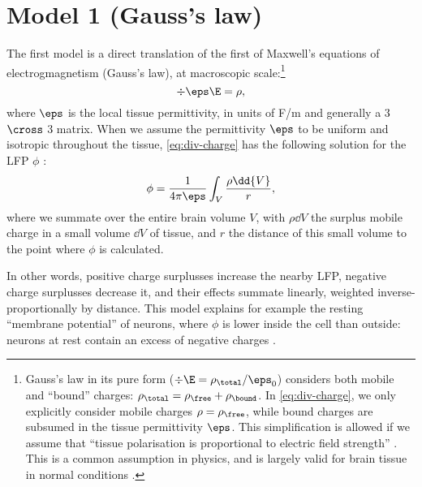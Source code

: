 \section{Model 1 (Gauss's law)}

The first model is a direct translation of the first of Maxwell's equations of electrogmagnetism (Gauss's law), at macroscopic scale:\footnote{Gauss's law in its pure form ($\div{\E} = \rho_\total / \eps_0$) considers both mobile and ``bound'' charges: $\rho_\total = \rho_\free + \rho_\bound$. In \cref{eq:div-charge}, we only explicitly consider mobile charges $\rho = \rho_\free$, while bound charges are subsumed in the tissue permittivity $\eps$. This simplification is allowed if we assume that ``tissue polarisation is proportional to electric field strength'' \cite{Feynman2013}. This is a common assumption in physics, and is largely valid for brain tissue in normal conditions \cite{Nunez2006}.}
%
\begin{equation}
\label{eq:div-charge}
\div{\eps \E} = \rho,
\end{equation}
%
where $\eps$ is the local tissue permittivity, in units of F/m and generally a 3 $\cross$ 3 matrix. When we assume the permittivity $\eps$ to be uniform and isotropic throughout the tissue\footnotemark{}, \cref{eq:div-charge} has the following solution for the LFP $\phi$ \cite{Feynman2013}:
%
\begin{equation}
\label{eq:phi-charge}
\phi = \frac{1}{4 \pi \eps} \int_V \frac{\rho \dd{V}}{r},
\end{equation}
%
where we summate over the entire brain volume $V$, with $\rho \dd{V}$ the surplus mobile charge in a small volume $\dd{V}$ of tissue, and $r$ the distance of this small volume to the point where $\phi$ is calculated.


In other words, positive charge surplusses increase the nearby LFP, negative charge surplusses decrease it, and their effects summate linearly, weighted inverse-proportionally by distance. This model explains for example the resting ``membrane potential'' of neurons, where $\phi$ is lower inside the cell than outside: neurons at rest contain an excess of negative charges \cite{Dayan2001b}.

